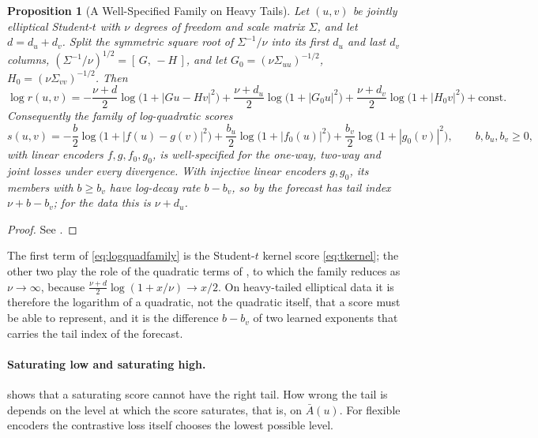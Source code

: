 \documentclass[11pt]{article}
\theoremstyle{plain}
\newtheorem{proposition}[theorem]{Proposition}
\theoremstyle{definition}
\theoremstyle{remark}
\newcommand{\abs}[1]{\left\lvert #1 \right\rvert}
\begin{document}
\begin{proposition}[A Well-Specified Family on Heavy Tails]
 \label{prop:logquad}
 Let $(u,v)$ be jointly elliptical Student-$t$ with $\nu$ degrees of freedom
 and scale matrix $\Sigma$, and let $d=d_u+d_v$. Split the symmetric square
 root of $\Sigma^{-1}/\nu$ into its first $d_u$ and last $d_v$ columns,
 $(\Sigma^{-1}/\nu)^{1/2}=[\,G,\,-H\,]$, and let
 $G_0=(\nu\Sigma_{uu})^{-1/2}$, $H_0=(\nu\Sigma_{vv})^{-1/2}$. Then
 \begin{equation}
  \log r(u,v)=-\frac{\nu+d}{2}\log\bigl(1+\abs{Gu-Hv}^{2}\bigr)
  +\frac{\nu+d_u}{2}\log\bigl(1+\abs{G_0u}^{2}\bigr)
  +\frac{\nu+d_v}{2}\log\bigl(1+\abs{H_0v}^{2}\bigr)+\mathrm{const}.
  \label{eq:logquad}
 \end{equation}
 Consequently the family of \emph{log-quadratic scores}
 \begin{equation}
  s(u,v)=-\frac{b}{2}\log\bigl(1+\abs{f(u)-g(v)}^{2}\bigr)
  +\frac{b_u}{2}\log\bigl(1+\abs{f_0(u)}^{2}\bigr)
  +\frac{b_v}{2}\log\bigl(1+\abs{g_0(v)}^{2}\bigr),
  \qquad b,b_u,b_v\ge0,
  \label{eq:logquadfamily}
 \end{equation}
 with \emph{linear} encoders $f,g,f_0,g_0$, is well-specified for the one-way,
 two-way and joint losses under every divergence. With injective linear
 encoders $g,g_0$, its members with $b\ge b_v$ have log-decay rate $b-b_v$,
 so by  the forecast has tail index $\nu+b-b_v$; for the data
 this is $\nu+d_u$.
\end{proposition}
\begin{proof}
 See .
\end{proof}

The first term of \eqref{eq:logquadfamily} is the Student-$t$ kernel score
\eqref{eq:tkernel}; the other two play the role of the quadratic terms of
, to which the family reduces as $\nu\to\infty$, because
$\tfrac{\nu+d}{2}\log(1+x/\nu)\to x/2$. On heavy-tailed elliptical data it is
therefore the logarithm of a quadratic, not the quadratic itself, that a
score must be able to represent, and it is the difference $b-b_v$ of two
learned exponents that carries the tail index of the forecast.

\paragraph{Saturating low and saturating high.}
 shows that a saturating score cannot have the right
tail. How wrong the tail is depends on the level at which the score
saturates, that is, on $\bar A(u)$. For flexible encoders the contrastive
loss itself chooses the lowest possible level.
\end{document}
